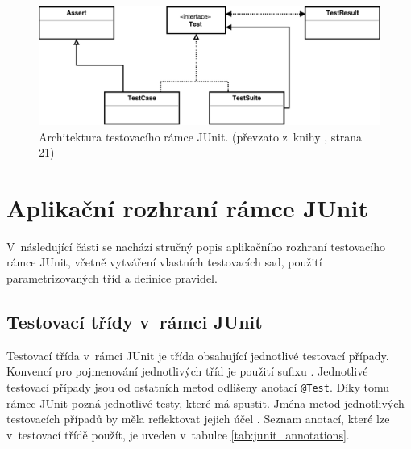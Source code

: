     \begin{figure}
      \includegraphics[width=\textwidth, center]{obrazky-figures/junit_arch.pdf}
      \caption{Architektura testovacího rámce JUnit. (převzato z~knihy \cite{JUnitGuide}, strana 21)}
      \label{fig:junit_arch}
    \end{figure}


  \section{Aplikační rozhraní rámce JUnit}
  V~následující části se nachází stručný popis aplikačního rozhraní testovacího rámce JUnit, včetně vytváření vlastních testovacích sad, použití parametrizovaných tříd a definice pravidel.

    \subsection{Testovací třídy v~rámci JUnit}
    Testovací třída v~rámci JUnit je třída obsahující jednotlivé testovací případy. Konvencí pro pojmenování jednotlivých tříd je použití sufixu . Jednotlivé testovací případy jsou od ostatních metod odlišeny anotací \texttt{@Test}. Díky tomu rámec JUnit pozná jednotlivé testy, které má spustit. Jména metod jednotlivých testovacích případů by měla reflektovat jejich účel  \cite{vogella:JUnit}. Seznam anotací, které lze v~testovací třídě použít, je uveden v~tabulce \ref{tab:junit_annotations}.


